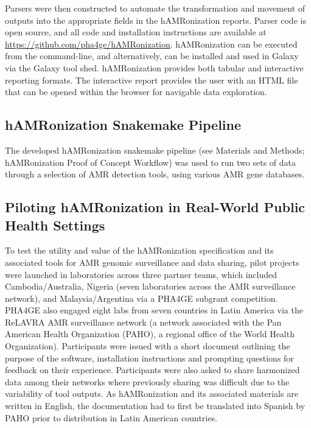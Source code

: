 Parsers were then constructed to automate the transformation and movement of outputs into the appropriate fields in the hAMRonization reports. Parser code is open source, and all code and installation instructions are available at \url{https://github.com/pha4ge/hAMRonization}. hAMRonization can be executed from the command-line, and alternatively, can be installed and used in Galaxy via the Galaxy tool shed.
hAMRonization provides both tabular and interactive reporting formats. The interactive report provides the user with an HTML file that can be opened within the browser for navigable data exploration.

\subsection{hAMRonization Snakemake Pipeline}

The developed  hAMRonization snakemake pipeline (see Materials and  Methods;  hAMRonization Proof of Concept Workflow) was used to run two sets of data through a selection of AMR detection tools, using various AMR gene databases. 

\subsection{Piloting hAMRonization in Real-World Public Health Settings}

To test the utility and value of the hAMRonization specification and its associated tools for AMR genomic surveillance and data sharing, pilot projects were launched in laboratories across three partner teams, which included Cambodia/Australia, Nigeria (seven laboratories across the AMR surveillance network), and Malaysia/Argentina via a PHA4GE subgrant competition. PHA4GE also engaged eight labs from seven countries in Latin America via the ReLAVRA AMR surveillance network (a network associated with the Pan American Health Organization (PAHO), a regional office of the World Health Organization). Participants were issued with a short document outlining the purpose of the software, installation instructions and prompting questions for feedback on their experience. Participants were also asked to share harmonized data among their networks where previously sharing was difficult due to the variability of tool outputs. As hAMRonization and its associated materials are written in English, the documentation had to first be translated into Spanish by PAHO prior to distribution in Latin American countries. 

